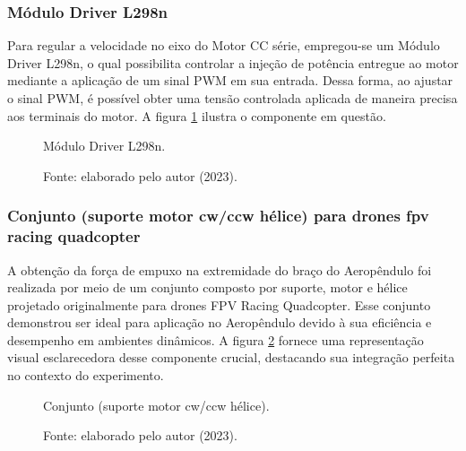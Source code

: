 \subsubsection{Módulo Driver L298n}
\label{driver_l298n}

Para regular a velocidade no eixo do Motor CC série, empregou-se um Módulo Driver L298n, o qual possibilita controlar a injeção de potência entregue ao motor mediante a aplicação de um sinal PWM em sua entrada. Dessa forma, ao ajustar o sinal PWM, é possível obter uma tensão controlada aplicada de maneira precisa aos terminais do motor. A figura \ref{fig3:image_07} ilustra o componente em questão.

\begin{figure}[!h]
	\centering
	\caption{Módulo Driver L298n.}
	\caption*{Fonte: elaborado pelo autor (2023).}
	\label{fig3:image_07}
\end{figure}


\subsubsection{Conjunto (suporte motor cw/ccw hélice) para drones fpv racing quadcopter}


A obtenção da força de empuxo na extremidade do braço do Aeropêndulo foi realizada por meio de um conjunto composto por suporte, motor e hélice projetado originalmente para drones FPV Racing Quadcopter. Esse conjunto demonstrou ser ideal para aplicação no Aeropêndulo devido à sua eficiência e desempenho em ambientes dinâmicos. A figura \ref{fig3:image_08} fornece uma representação visual esclarecedora desse componente crucial, destacando sua integração perfeita no contexto do experimento.


\begin{figure}[!h]
	\centering
	\caption{Conjunto (suporte motor cw/ccw hélice).}
	\caption*{Fonte: elaborado pelo autor (2023).}
	\label{fig3:image_08}
\end{figure}

